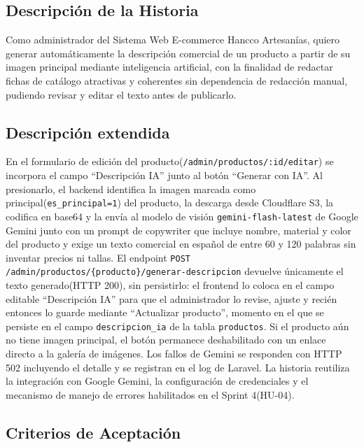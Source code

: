 \documentclass[12pt,a4paper]{article}
\begin{document}
\subsection*{Descripción de la Historia}

Como administrador del Sistema Web E-commerce Hancco Artesanías, quiero generar automáticamente la descripción comercial de un producto a partir de su imagen principal mediante inteligencia artificial, con la finalidad de redactar fichas de catálogo atractivas y coherentes sin dependencia de redacción manual, pudiendo revisar y editar el texto antes de publicarlo.

\subsection*{Descripción extendida}

En el formulario de edición del producto(\texttt{/admin/productos/:id/editar}) se incorpora el campo ``Descripción IA'' junto al botón ``Generar con IA''. Al presionarlo, el backend identifica la imagen marcada como principal(\texttt{es\_principal=1}) del producto, la descarga desde Cloudflare S3, la codifica en base64 y la envía al modelo de visión \texttt{gemini-flash-latest} de Google Gemini junto con un prompt de copywriter que incluye nombre, material y color del producto y exige un texto comercial en español de entre 60 y 120 palabras sin inventar precios ni tallas. El endpoint \texttt{POST /admin/productos/\{producto\}/generar-descripcion} devuelve únicamente el texto generado(HTTP 200), sin persistirlo: el frontend lo coloca en el campo editable ``Descripción IA'' para que el administrador lo revise, ajuste y recién entonces lo guarde mediante ``Actualizar producto'', momento en el que se persiste en el campo \texttt{descripcion\_ia} de la tabla \texttt{productos}. Si el producto aún no tiene imagen principal, el botón permanece deshabilitado con un enlace directo a la galería de imágenes. Los fallos de Gemini se responden con HTTP 502 incluyendo el detalle y se registran en el log de Laravel. La historia reutiliza la integración con Google Gemini, la configuración de credenciales y el mecanismo de manejo de errores habilitados en el Sprint 4(HU-04).

\subsection*{Criterios de Aceptación}
\end{document}
